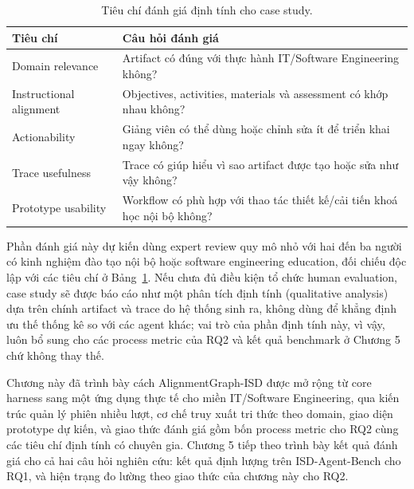 \documentclass[../main.tex]{subfiles}
\begin{document}
\begin{table}[H]
\centering
\small
\caption{Tiêu chí đánh giá định tính cho case study.}
\label{tab:case-study-criteria}
\begin{tabular}{p{3.2cm}p{9.5cm}}
\hline
\textbf{Tiêu chí} & \textbf{Câu hỏi đánh giá} \\
\hline
Domain relevance & Artifact có đúng với thực hành IT/Software Engineering không? \\
Instructional alignment & Objectives, activities, materials và assessment có khớp nhau không? \\
Actionability & Giảng viên có thể dùng hoặc chỉnh sửa ít để triển khai ngay không? \\
Trace usefulness & Trace có giúp hiểu vì sao artifact được tạo hoặc sửa như vậy không? \\
Prototype usability & Workflow có phù hợp với thao tác thiết kế/cải tiến khoá học nội bộ không? \\
\hline
\end{tabular}
\end{table}

Phần đánh giá này dự kiến dùng expert review quy mô nhỏ với hai đến ba người có kinh nghiệm đào tạo nội bộ hoặc software engineering education, đối chiếu độc lập với các tiêu chí ở Bảng~\ref{tab:case-study-criteria}. Nếu chưa đủ điều kiện tổ chức human evaluation, case study sẽ được báo cáo như một phân tích định tính (qualitative analysis) dựa trên chính artifact và trace do hệ thống sinh ra, không dùng để khẳng định ưu thế thống kê so với các agent khác; vai trò của phần định tính này, vì vậy, luôn bổ sung cho các process metric của RQ2 và kết quả benchmark ở Chương 5 chứ không thay thế.

Chương này đã trình bày cách AlignmentGraph-ISD được mở rộng từ core harness sang một ứng dụng thực tế cho miền IT/Software Engineering, qua kiến trúc quản lý phiên nhiều lượt, cơ chế truy xuất tri thức theo domain, giao diện prototype dự kiến, và giao thức đánh giá gồm bốn process metric cho RQ2 cùng các tiêu chí định tính có chuyên gia. Chương 5 tiếp theo trình bày kết quả đánh giá cho cả hai câu hỏi nghiên cứu: kết quả định lượng trên ISD-Agent-Bench cho RQ1, và hiện trạng đo lường theo giao thức của chương này cho RQ2.
\end{document}
